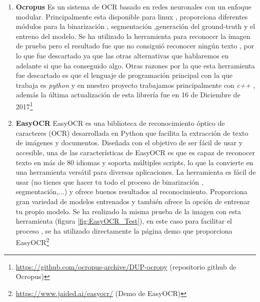 \begin{enumerate}
	\item \textbf{Ocropus}
	Es un sistema de OCR basado en redes neuronales con un enfoque modular.
	Principalmente esta disponible para linux , proporciona diferentes módulos para la binarización , segmentación ,generación del ground-truth y el entreno del modelo.
	Se ha utilizado la herramienta para reconocer la imagen de prueba pero el resultado fue que no consiguió reconocer ningún texto , por lo que fue descartado ya que las otras alternativas que hablaremos en adelante si que ha conseguido algo.
	Otras razones por la que esta herramienta fue descartado es que el lenguaje de programación principal con la que trabaja es \emph{python} y en nuestro proyecto trabajamos principalmente con \emph{c++} , además la última actualización de esta librería fue en 16 de Diciembre de 2017\footnote{\url{https://github.com/ocropus-archive/DUP-ocropy} (repositorio github de Ocropus)}
	\item \textbf{EasyOCR}
	EasyOCR es una biblioteca de reconocimiento óptico de caracteres (OCR) desarrollada en Python que facilita la extracción de texto de imágenes y documentos. Diseñada con el objetivo de ser fácil de usar y accesible, una de las características de EasyOCR es que es capaz de reconocer texto en más de 80 idiomas y soporta múltiples scripts, lo que la convierte en una herramienta versátil para diversas aplicaciones.
	La herramienta es fácil de usar (no tienes que hacer tu todo el proceso de binarización , segmentación,...) y ofrece buenos resultados al reconocimiento.
	Proporciona gran variedad de modelos entrenados y también ofrece la opción de entrenar tu propio modelo.
	Se ha realizado la misma prueba de la imagen con esta herramienta (figura \ref{fig:EasyOCR_Test}), en este caso para facilitar el proceso , se ha utilizado directamente la página demo que proporciona EasyOCR\footnote{\url{https://www.jaided.ai/easyocr/} (Demo de EasyOCR)}
	

\end{enumerate}
